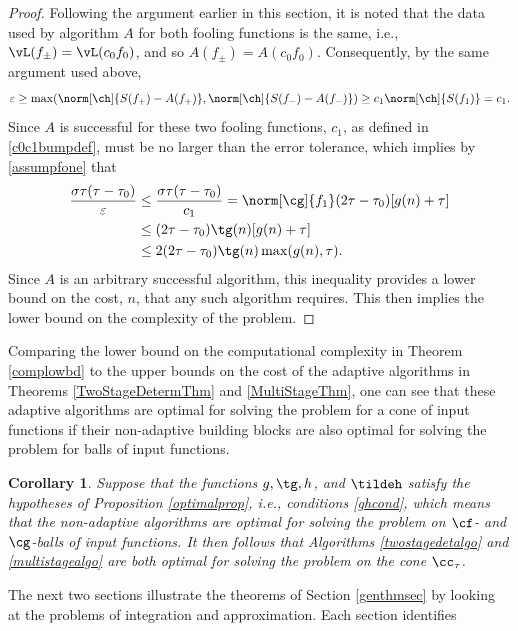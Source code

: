 \documentclass[]{elsarticle}
\newtheorem{cor}{Corollary}
\theoremstyle{definition}
\theoremstyle{remark}
\begin{document}
\begin{proof}
Following the argument earlier in this section, it is noted that the data used by algorithm $A$ for both fooling functions is the same, i.e., $\vL(f_{\pm})=\vL(c_0f_0)$, and so $A(f_{\pm})=A(c_0f_0)$.  Consequently, by the same argument used above, 
\[
\varepsilon  \ge  \max(\norm[\ch]{S(f_+)-A(f_+)},\norm[\ch]{S(f_-)-A(f_-)}) \ge c_1 \norm[\ch]{S(f_1)}=c_1.
\]
Since $A$ is successful for these two fooling functions, $c_1$, as defined in \eqref{c0c1bumpdef}, must be no larger than the error tolerance, which implies by \eqref{assumpfone} that 
\begin{align*}
\frac{\sigma \tau(\tau-\tau_0)}{\varepsilon} & \le \frac{\sigma \tau(\tau-\tau_0)}{c_1}  = \norm[\cg]{f_1} (2\tau - \tau_0) [g(n) + \tau] \\
&\le (2\tau - \tau_0) \tg(n) [g(n) + \tau] \\
&\le 2 (2\tau - \tau_0) \tg(n)\max(g(n), \tau).
\end{align*}
Since $A$ is an arbitrary successful algorithm, this inequality provides a lower bound on the cost, $n$, that any such algorithm requires.  This then implies the lower bound on the complexity of the problem.   
\end{proof}

Comparing the lower bound on the computational complexity in Theorem \ref{complowbd} to the upper bounds on the cost of the adaptive algorithms in Theorems \ref{TwoStageDetermThm} and \ref{MultiStageThm}, one can see that these adaptive algorithms are optimal for solving the problem for a cone of input functions if their non-adaptive building blocks are also optimal for solving the problem for balls of input functions.

\begin{cor} \label{optimcor}
Suppose that the functions $g, \tg, h$, and $\tildeh$ satisfy the hypotheses of Proposition \ref{optimalprop}, i.e., conditions \eqref{ghcond}, which means that the non-adaptive algorithms are optimal for solving the problem on $\cf$- and $\cg$-balls of input functions.  It then follows that Algorithms \ref{twostagedetalgo} and \ref{multistagealgo} are both optimal for solving the  problem on the cone $\cc_{\tau}$.  
\end{cor}

\vspace{0.5cm}

The next two sections illustrate the theorems of Section \ref{genthmsec} by looking at the problems of integration and approximation.  Each section identifies 
\end{document}
